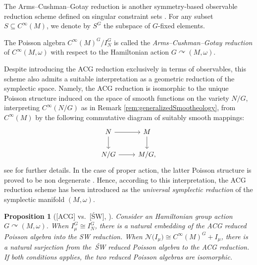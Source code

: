 \documentclass[pdftex]{sigma}
\numberwithin{equation}{section}
\newtheorem{Proposition}[Theorem]{Proposition}
 { \theoremstyle{definition}
\newtheorem{Definition}[Theorem]{Definition}
\newtheorem{Note}[Theorem]{Note}
\newtheorem{Example}[Theorem]{Example}
\newtheorem{Remark}[Theorem]{Remark} }
\DeclareMathOperator{\action}{\curvearrowright}
\renewcommand{\subset}{\subseteq}
\begin{document}
The Arms--Cushman--Gotay reduction is another symmetry-based observable reduction scheme defined on singular constraint sets \cite{ArmsCushmanGotay91}.
For any subset $S\subset C^\infty(M)$, we denote by $S^G$ the subspace of $G$-fixed elements.

\begin{Definition}\label{def:ACGreduction}
	The Poisson algebra $C^\infty(M)^G / I_N^G$ is called the \emph{Arms--Cushman--Gotay reduction} of $C^\infty(M,\omega)$ with respect to the Hamiltonian action $G\action (M,\omega)$.
\end{Definition}

\begin{Remark}
	Despite introducing the ACG reduction exclusively in terms of observables, this scheme also admits a suitable interpretation as a geometric reduction of the symplectic space.
Namely, the ACG reduction is isomorphic to the unique Poisson structure  induced on the space of smooth functions on the variety $N/G$, interpreting $C^\infty(N/G)$ as in Remark \ref{rem:generalizedSmootheology}, from $C^\infty(M)$ by the following commutative diagram of suitably smooth mappings:
	\begin{displaymath}
	\begin{tikzcd}
		N \ar[r]\ar[d] & M \ar[d]\\
		N/G \ar[r]& M/G,
	\end{tikzcd}
	\end{displaymath}
see \cite[Theorem~1]{ArmsCushmanGotay91} for further details.
In the case of proper action, the latter Poisson structure is proved to be non degenerate \cite[Theorem~2]{ArmsCushmanGotay91}.
Hence, according to this interpretation, the ACG reduction scheme has been introduced as the \emph{universal symplectic reduction} of the symplectic manifold $(M,\omega)$.
\end{Remark}

\begin{Proposition}[{[ACG] vs.\ [\'SW], \cite[Theorem~6.1]{ArmsGotayJennings90}}]\label{prop:ACGvsSW}
	Consider an Hamiltonian group action $G\action (M,\omega)$.
	When $I_\mu^G \cong I_N^G$, there is a natural embedding of the ACG reduced Poisson algebra into the SW reduction.
	When $\mathcal{N}\bigl(I_\mu\bigr) \cong C^\infty(M)^G + I_\mu$, there is a natural surjection from the~\'SW reduced Poisson algebra to the ACG reduction.
	If both conditions applies, the two reduced Poisson algebras are isomorphic.
\end{Proposition}
\end{document}

